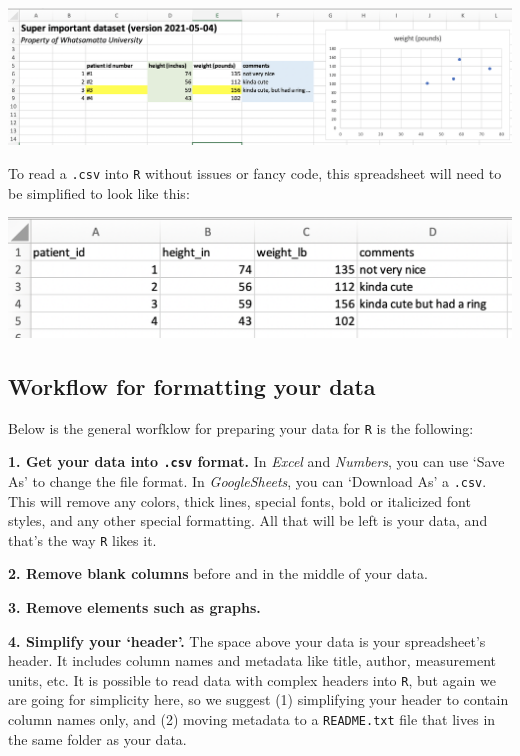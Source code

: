 \documentclass[
]{book}
\begin{document}
\includegraphics{img/csv_dont.png}

To read a \texttt{.csv} into \texttt{R} without issues or fancy code, this spreadsheet will need to be simplified to look like this:

\includegraphics{img/csv_do.png}

\hypertarget{workflow-for-formatting-your-data}{%
\subsection*{Workflow for formatting your data}\label{workflow-for-formatting-your-data}}

Below is the general worfklow for preparing your data for \texttt{R} is the following:

\textbf{1. Get your data into \texttt{.csv} format.} In \emph{Excel} and \emph{Numbers}, you can use `Save As' to change the file format. In \emph{GoogleSheets}, you can `Download As' a \texttt{.csv}. This will remove any colors, thick lines, special fonts, bold or italicized font styles, and any other special formatting. All that will be left is your data, and that's the way \texttt{R} likes it.

\textbf{2. Remove blank columns} before and in the middle of your data.

\textbf{3. Remove elements such as graphs.}

\textbf{4. Simplify your `header'.} The space above your data is your spreadsheet's header. It includes column names and metadata like title, author, measurement units, etc. It is possible to read data with complex headers into \texttt{R}, but again we are going for simplicity here, so we suggest (1) simplifying your header to contain column names only, and (2) moving metadata to a \texttt{README.txt} file that lives in the same folder as your data.
\end{document}
